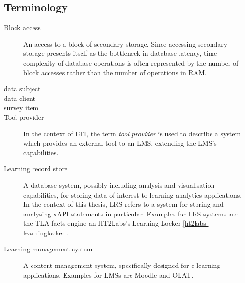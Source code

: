 \subsection{Terminology}
\begin{description}
	\item[Block access] 
		An access to a block of secondary storage. Since accessing secondary storage
		presents itself as the bottleneck in database latency, time complexity of
		database operations is often represented by the number of block accesses rather
		than the number of operations in RAM.
    \item[data subject]
    \item[data client]
    \item[survey item] 
    \item[Tool provider]
	    In the context of LTI, the term \textit{tool provider} is used to describe a
	    system which provides an external tool to an LMS, extending the LMS's capabilities.
    \item[Learning record store]
    	A database system, possibly including analysis and visualisation capabilities, 
	    for storing data of interest to learning analytics applications.
	    In the context of this thesis, LRS refers to a system for storing and analysing xAPI statements in particular.
    	Examples for LRS systems are the TLA facts engine an HT2Labs's Learning Locker \ref{ht2labs-learninglocker}.
    \item[Learning management system]
	    A content management system, specifically designed for e-learning applications.
	    Examples for LMSs are Moodle and OLAT.
\end{description}
